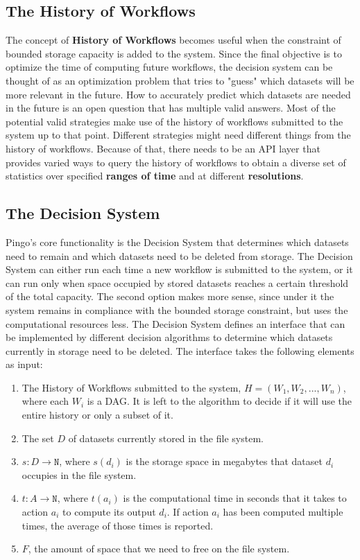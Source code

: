 \subsection{The History of Workflows}
The concept of \textbf{History of Workflows} becomes useful when the constraint of bounded storage capacity is added to the system. Since the final objective is to optimize the time of computing future workflows, the decision system can be thought of as an optimization problem that tries to "guess" which datasets will be more relevant in the future. How to accurately predict which datasets are needed in the future is an open question that has multiple valid answers. Most of the potential valid strategies make use of the history of workflows submitted to the system up to that point.  Different strategies might need different things from the history of workflows. Because of that, there needs to be an API layer that provides varied ways to query the history of workflows to obtain a diverse set of statistics over specified \textbf{ranges of time} and at different \textbf{resolutions}.

\subsection{The Decision System}
\label{sec:decision_system}
Pingo's core functionality is the Decision System that determines which datasets need to remain and which datasets need to be deleted from storage.  The Decision System can either run each time a new workflow is submitted to the system, or it can run only when space occupied by stored datasets reaches a certain threshold of the total capacity.  The second option makes more sense, since under it the system remains in compliance with the bounded storage constraint, but uses the computational resources less. The Decision System defines an interface that can be implemented by different decision algorithms to determine which datasets currently in storage need to be deleted. The interface takes the following elements as input:

\begin{enumerate}
\item The History of Workflows submitted to the system, $H = (W_1, W_2, ..., W_n)$, where each $W_i$ is a DAG. It is left to the algorithm to decide if it will use the entire history or only a subset of it.

\item The set $D$ of datasets currently stored in the file system. 

\item $s: D \to \mathtt{N} $, where $s(d_i)$ is the storage space in megabytes that dataset $d_i$ occupies in the file system.

\item $t: A \to \mathtt{N}$, where $t(a_i)$ is the computational time in seconds that it takes to action $a_i$ to compute its output $d_i$.  If action $a_i$ has been computed multiple times, the average of those times is reported.

\item $F$, the amount of space that we need to free on the file system.

\end{enumerate}

